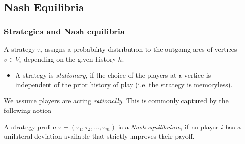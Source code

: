 \documentclass[english, aspectratio=169]{beamer}
\begin{document}
\subsection{Nash Equilibria}
\begin{frame}
  \frametitle{Strategies and Nash equilibria}
  A strategy $\tau_i$ assigns a probability distribution to the outgoing arcs of
  vertices $v \in V_i$ depending on the given history $h$.

  \begin{itemize}
  \item A strategy is \emph{stationary}, if the choice of the players at a
    vertice is independent of the prior history of play (i.e. the strategy is
    memoryless).
  \end{itemize}
  
  \pause
  
  We assume players are acting \emph{rationally}. This is commonly captured by
  the following notion

  \begin{definition}
    A strategy profile $\tau = (\tau_1, \tau_2, \dots, \tau_m)$ is a \emph{Nash
      equilibrium}, if no player $i$ has a unilateral deviation available that
    strictly improves their payoff.
  \end{definition}
\end{frame}
\end{document}
